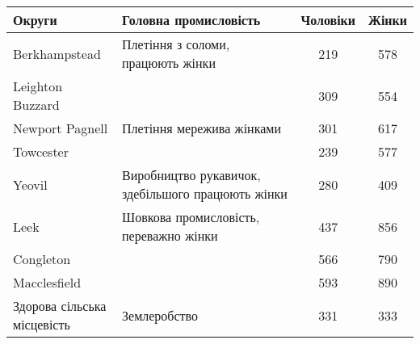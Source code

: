 \begin{table}[t]
	\centering
	\small
	\begin{tabular}{l l c c}
		\toprule
		Округи &
		Головна промисловість &
		Чоловіки & Жінки \\
		\midrule
		
		Berkhampstead    & Плетіння з соломи, працюють жінки & 219 & 578 \\
		Leighton Buzzard  &                                       & 309 & 554 \\
		Newport Pagnell  & Плетіння мережива жінками         & 301 & 617 \\
		Towcester        &                                        & 239 & 577 \\
		Yeovil           & \makecell[lb]{Виробництво рукавичок,\\здебільшого працюють жінки} & 280 & 409 \\
		Leek             & \makecell[lb]{Шовкова промисловість, \\ переважно жінки} & 437 & 856 \\
		Congleton        &                                             & 566 & 790 \\
		Macclesfield     &                                             & 593 & 890 \\
		\makecell[lb]{Здорова сільська \\ місцевість} &   Землеробство                         & 331 & 333 \\
	\end{tabular}
\end{table}

